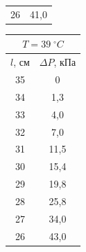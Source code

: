 \documentclass[a4paper]{article}
\begin{document}
\begin{figure}[htb]
\begin{minipage}[b]{0.3\textwidth}
\begin{tabular}{c|c}
			26&41,0
		\end{tabular}
	\end{minipage}
	\hfil
	\begin{minipage}[b]{0.3\textwidth}

		\begin{tabular}{c|c}
			\multicolumn{2}{c}{$T=39\;^{\circ} C$}\\
			\hline
			$l$, см&$\Delta P$, кПа  \\
			\hline
			35&  0\\
			
			34& 1,3 \\
			
			33&  4,0\\
			
			32&  7,0\\
			
			31&11,5 \\
			
			30& 15,4 \\
			
			29&  19,8\\
			
			28&  25,8\\
			
			27&34,0\\
			
			26&43,0
		\end{tabular}
	\end{minipage}
\end{figure}
	
\end{document}
